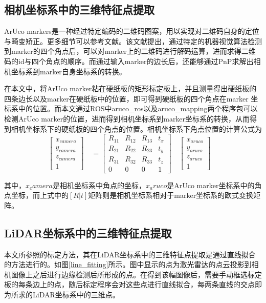 \subsection{相机坐标系中的三维特征点提取}

ArUco markers是一种经过特定编码的二维码图案，用以实现对二维码自身的定位与畸变矫正。更多细节可以参考文献。该文献提出，通过特定的机器视觉算法检测到marker的四个角点后，可以对marker上的二维码进行解码运算，进而求得二维码的id与四个角点的顺序。而通过输入marker的边长后，还能够通过PnP求解出相机坐标系到marker自身坐标系的转换。


在本文中，将ArUco marker粘在硬纸板的矩形标定板上，并且测量得出硬纸板的四条边长以及marker在硬纸板中的位置，即可得到硬纸板的四个角点在marker 坐标系中的位置。而本文通过ROS中aruco\_ros以及aruco\_mapping两个程序包可以检测ArUco marker的位置，进而得到相机坐标系到marker坐标系的转换，从而得到相机坐标系下的硬纸板的四个角点的位置。相机坐标系下角点位置的计算公式为
\begin{equation}
\begin{bmatrix} x_{camera}\\y_{camera}\\z_{camera}\\ 1 \end{bmatrix}\quad = \begin{bmatrix} R_{11}&R_{12}&R_{13}&t_x\\R_{21}&R_{22}&R_{23}&t_y\\R_{31}&R_{32}&R_{33}&t_z\\ 0&0&0&1 \end{bmatrix}\quad \begin{bmatrix} x_{aruco}\\y_{aruco}\\z_{aruco}\\ 1 \end{bmatrix}\quad
\end{equation}
    
其中，$x_camera$是相机坐标系中角点的坐标，$x_aruco$是ArUco marker坐标系中的角点坐标，而上式中的$[R|t]$矩阵则是相机坐标系相对于marker坐标系的欧式变换矩阵。

\subsection{LiDAR坐标系中的三维特征点提取}

本文所参照的标定方法，其在LiDAR坐标系中的三维特征点提取是通过直线拟合的方法进行的。如图\ref{line_fitting}所示。图中显示的点为激光雷达的点云投影到相机图像上之后进行边缘检测后所形成的点。在得到该幅图像后，需要手动框选标定板的每条边上的点，随后标定程序会对这些点进行直线拟合，每两条直线的交点即为所求的LiDAR坐标系中的三维点。

